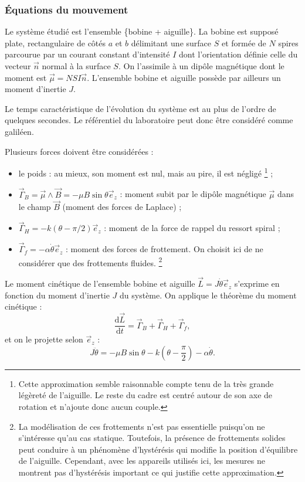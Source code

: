 \documentclass[12pt,a4paper,fleqn]{article}
\newcommand{\ez}{\vec{e}_z}
\renewcommand{\d}{\mathrm{d}}
\begin{document}
\subsubsection{Équations du mouvement}

Le système étudié est l'ensemble \{bobine + aiguille\}.
La bobine est supposé plate, rectangulaire de côtés $a$ et $b$ délimitant une surface $S$ et formée de $N$ spires parcourue par un courant constant d'intensité $I$ dont l'orientation définie celle du vecteur $\vec{n}$ normal à la surface $S$.
On l'assimile à un dipôle magnétique dont le moment est $\vec{\mu} = NSI\vec{n}$.
L'ensemble bobine et aiguille possède par ailleurs un moment d'inertie $J$.

Le temps caractéristique de l'évolution du système est au plus de l'ordre de quelques secondes.
Le référentiel du laboratoire peut donc être considéré comme galiléen.

Plusieurs forces doivent être considérées :
\begin{itemize}
    \item le poids : au mieux, son moment est nul, mais au pire, il est négligé \footnote{Cette approximation semble raisonnable compte tenu de la très grande légèreté de l'aiguille.
    Le reste du cadre est centré autour de son axe de rotation et n'ajoute donc aucun couple.} ;
    \item $\vec{\Gamma}_B = \vec{\mu} \wedge \vec{B} = - \mu B \sin \theta \ez$ : moment subit par le dipôle magnétique $\vec{\mu}$ dans le champ $\vec{B}$ (moment des forces de Laplace) ;
    \item $\vec{\Gamma}_H = -k(\theta-\pi/2)\ez$ : moment de la force de rappel du ressort spiral ;
    \item $\vec{\Gamma}_f = -\alpha\dot{\theta}\ez$ : moment des forces de frottement.
    On choisit ici de ne considérer que des frottements fluides.
    \footnote{
        La modélisation de ces frottements n'est pas essentielle puisqu'on ne s'intéresse qu'au cas statique.
        Toutefois, la présence de frottements solides peut conduire à un phénomène d'hystérésis qui modifie la position d'équilibre de l'aiguille.
        Cependant, avec les appareils utilisés ici, les mesures ne montrent pas d'hystérésis important ce qui justifie cette approximation.}
\end{itemize}

Le moment cinétique de l'ensemble bobine et aiguille $\vec{L} = J\dot{\theta}\ez$ s'exprime en fonction du moment d'inertie $J$ du système.
On applique le théorème du moment cinétique :
\begin{equation}
    \frac{\d\vec{L}}{\d t} 	= \vec{\Gamma}_B + \vec{\Gamma}_H + \vec{\Gamma}_f,
\end{equation}
et on le projette selon $\ez$ :
\begin{equation}
    J\ddot{\theta} = -\mu B \sin \theta - k\left(\theta-\frac{\pi}{2}\right) - \alpha\dot{\theta}.
    \label{eq:mvt}
\end{equation}
\end{document}
